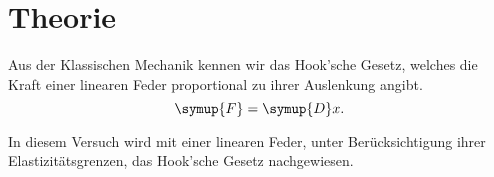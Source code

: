 \section{Theorie}
\label{sec:Theorie}
Aus der Klassischen Mechanik kennen wir das Hook'sche Gesetz, welches die Kraft einer linearen
Feder proportional zu ihrer Auslenkung angibt.
\begin{equation}
    \symup{F} = \symup{D}x.\label{eq:1}
\end{equation}

In diesem Versuch wird mit einer linearen Feder, unter Berücksichtigung ihrer Elastizitätsgrenzen,
 das Hook'sche Gesetz nachgewiesen.
